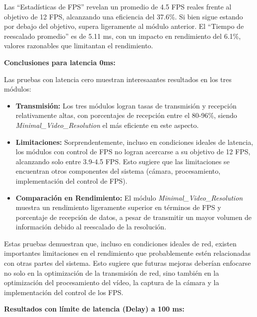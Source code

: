 Las ``Estadísticas de FPS'' revelan un promedio de 4.5 FPS reales frente al objetivo de 12 FPS, alcanzando una eficiencia del 37.6\%. Si bien sigue estando por debajo del objetivo, supera ligeramente al módulo anterior. El ``Tiempo de reescalado promedio'' es de 5.11 ms, con un impacto en rendimiento del 6.1\%, valores razonables que limitantan el rendimiento.
\vspace{\baselineskip}

\textbf{Conclusiones para latencia 0ms:}

Las pruebas con latencia cero muestran interesaantes resultados en los tres módulos:

\begin{itemize}
    \item \textbf{Transmisión:} Los tres módulos logran tasas de transmisión y recepción relativamente altas, con porcentajes de recepción entre el 80-96\%, siendo \textit{Minimal\_Video\_Resolution} el más eficiente en este aspecto.
    
    \item \textbf{Limitaciones:} Sorprendentemente, incluso en condiciones ideales de latencia, los módulos con control de FPS no logran acercarse a su objetivo de 12 FPS, alcanzando solo entre 3.9-4.5 FPS. Esto sugiere que las limitaciones se encuentran otros componentes del sistema (cámara, procesamiento, implementación del control de FPS).
    
    \item \textbf{Comparación en Rendimiento:} El módulo \textit{Minimal\_Video\_Resolution} muestra un rendimiento ligeramente superior en términos de FPS y porcentaje de recepción de datos, a pesar de transmitir un mayor volumen de información debido al reescalado de la resolución.

  \end{itemize}

Estas pruebas demuestran que, incluso en condiciones ideales de red, existen importantes limitaciones en el rendimiento que probablemente estén relacionadas con otras partes del sistema. Esto sugiere que futuras mejoras deberían enfocarse no solo en la optimización de la transmisión de red, sino también en la optimización del procesamiento del vídeo, la captura de la cámara y la implementación del control de los FPS.

\newpage

\textbf{Resultados con límite de latencia (Delay) a 100 ms:}
\vspace{\baselineskip}

